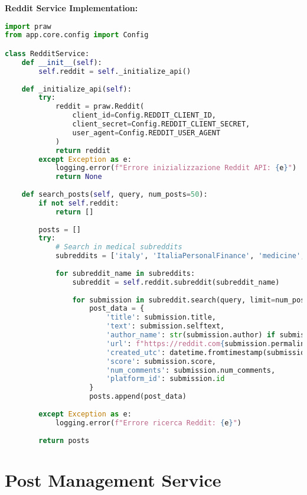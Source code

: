 \documentclass[12pt,a4paper]{report}
\begin{document}
\textbf{Reddit Service Implementation:}

\begin{lstlisting}[language=Python, caption=Reddit Service]
import praw
from app.core.config import Config

class RedditService:
    def __init__(self):
        self.reddit = self._initialize_api()
    
    def _initialize_api(self):
        try:
            reddit = praw.Reddit(
                client_id=Config.REDDIT_CLIENT_ID,
                client_secret=Config.REDDIT_CLIENT_SECRET,
                user_agent=Config.REDDIT_USER_AGENT
            )
            return reddit
        except Exception as e:
            logging.error(f"Errore inizializzazione Reddit API: {e}")
            return None
    
    def search_posts(self, query, num_posts=50):
        if not self.reddit:
            return []
        
        posts = []
        try:
            # Search in medical subreddits
            subreddits = ['italy', 'ItaliaPersonalFinance', 'medicine', 'health']
            
            for subreddit_name in subreddits:
                subreddit = self.reddit.subreddit(subreddit_name)
                
                for submission in subreddit.search(query, limit=num_posts//len(subreddits)):
                    post_data = {
                        'title': submission.title,
                        'text': submission.selftext,
                        'author_name': str(submission.author) if submission.author else 'deleted',
                        'url': f"https://reddit.com{submission.permalink}",
                        'created_utc': datetime.fromtimestamp(submission.created_utc),
                        'score': submission.score,
                        'num_comments': submission.num_comments,
                        'platform_id': submission.id
                    }
                    posts.append(post_data)
            
        except Exception as e:
            logging.error(f"Errore ricerca Reddit: {e}")
        
        return posts
\end{lstlisting}

\section{Post Management Service}
\end{document}
